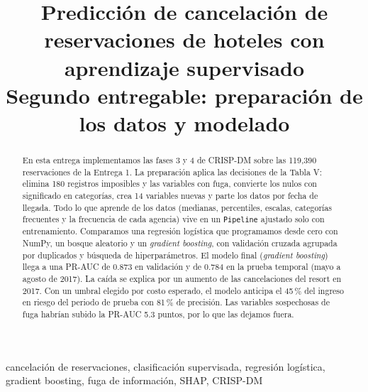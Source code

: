 \documentclass[conference]{IEEEtran}
\begin{document}
\title{Predicción de cancelación de reservaciones de hoteles con aprendizaje supervisado\\
\large Segundo entregable: preparación de los datos y modelado}

\author{
}

\maketitle

\setcounter{figure}{7}
\setcounter{table}{5}

\begin{abstract}
En esta entrega implementamos las fases 3 y 4 de CRISP-DM sobre las 119,390 reservaciones de la
Entrega 1. La preparación aplica las decisiones de la Tabla V: elimina 180 registros imposibles y
las variables con fuga, convierte los nulos con significado en categorías, crea 14 variables nuevas
y parte los datos por fecha de llegada. Todo lo que aprende de los datos (medianas, percentiles,
escalas, categorías frecuentes y la frecuencia de cada agencia) vive en un \texttt{Pipeline}
ajustado solo con entrenamiento. Comparamos una regresión logística que programamos desde cero
con NumPy, un bosque aleatorio y un \emph{gradient boosting}, con validación cruzada agrupada por
duplicados y búsqueda de hiperparámetros. El modelo final (\emph{gradient boosting}) llega a una
PR-AUC de 0.873 en validación y de 0.784 en la prueba temporal (mayo a agosto de 2017). La caída
se explica por un aumento de las cancelaciones del resort en 2017. Con un umbral elegido por
costo esperado, el modelo anticipa el 45\,\% del ingreso en riesgo del periodo de prueba con 81\,\%
de precisión. Las variables sospechosas de fuga habrían subido la PR-AUC 5.3 puntos, por lo que
las dejamos fuera.
\end{abstract}

\begin{IEEEkeywords}
cancelación de reservaciones, clasificación supervisada, regresión logística, gradient boosting,
fuga de información, SHAP, CRISP-DM
\end{IEEEkeywords}
\end{document}
